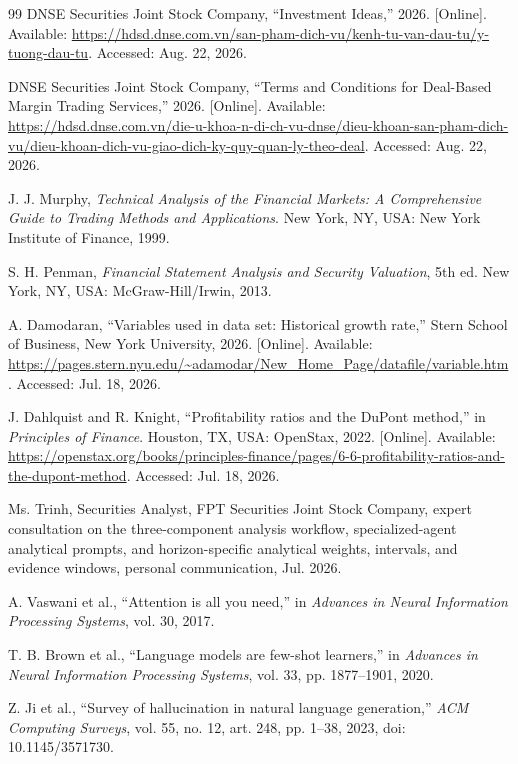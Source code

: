 \documentclass[12pt,a4paper,oneside]{report}
\begin{document}
\begin{thebibliography}{99}
DNSE Securities Joint Stock Company, ``Investment Ideas,'' 2026. [Online]. Available: \url{https://hdsd.dnse.com.vn/san-pham-dich-vu/kenh-tu-van-dau-tu/y-tuong-dau-tu}. Accessed: Aug. 22, 2026.

DNSE Securities Joint Stock Company, ``Terms and Conditions for Deal-Based Margin Trading Services,'' 2026. [Online]. Available: \url{https://hdsd.dnse.com.vn/die-u-khoa-n-di-ch-vu-dnse/dieu-khoan-san-pham-dich-vu/dieu-khoan-dich-vu-giao-dich-ky-quy-quan-ly-theo-deal}. Accessed: Aug. 22, 2026.

J. J. Murphy, \textit{Technical Analysis of the Financial Markets: A Comprehensive Guide to Trading Methods and Applications}. New York, NY, USA: New York Institute of Finance, 1999.

S. H. Penman, \textit{Financial Statement Analysis and Security Valuation}, 5th ed. New York, NY, USA: McGraw-Hill/Irwin, 2013.

A. Damodaran, ``Variables used in data set: Historical growth rate,'' Stern School of Business, New York University, 2026. [Online]. Available: \url{https://pages.stern.nyu.edu/~adamodar/New_Home_Page/datafile/variable.htm}. Accessed: Jul. 18, 2026.

J. Dahlquist and R. Knight, ``Profitability ratios and the DuPont method,'' in \textit{Principles of Finance}. Houston, TX, USA: OpenStax, 2022. [Online]. Available: \url{https://openstax.org/books/principles-finance/pages/6-6-profitability-ratios-and-the-dupont-method}. Accessed: Jul. 18, 2026.

Ms. Trinh, Securities Analyst, FPT Securities Joint Stock Company, expert consultation on the three-component analysis workflow, specialized-agent analytical prompts, and horizon-specific analytical weights, intervals, and evidence windows, personal communication, Jul. 2026.

A. Vaswani et al., ``Attention is all you need,'' in \textit{Advances in Neural Information Processing Systems}, vol. 30, 2017.

T. B. Brown et al., ``Language models are few-shot learners,'' in \textit{Advances in Neural Information Processing Systems}, vol. 33, pp. 1877--1901, 2020.

Z. Ji et al., ``Survey of hallucination in natural language generation,'' \textit{ACM Computing Surveys}, vol. 55, no. 12, art. 248, pp. 1--38, 2023, doi: 10.1145/3571730.


\end{thebibliography}
\end{document}
